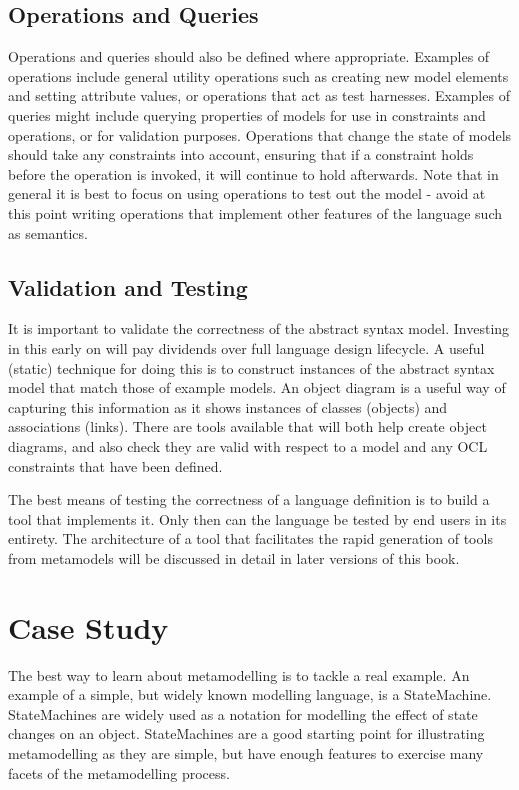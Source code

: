 \subsection{Operations and Queries}

Operations and queries should also be defined where appropriate.
Examples of operations include general utility operations such as
creating new model elements and setting attribute values, or
operations that act as test harnesses. Examples of queries might
include querying properties of models for use in constraints and
operations, or for validation purposes. Operations that change the
state of models should take any constraints into account, ensuring
that if a constraint holds before the operation is invoked, it
will continue to hold afterwards. Note that in general it is best
to focus on using operations to test out the model - avoid at this
point writing operations that implement other features of the
language such as semantics.

\subsection{Validation and Testing}

It is important to validate the correctness of the abstract syntax
model. Investing in this early on will pay dividends over full
language design lifecycle. A useful (static) technique for doing
this is to construct instances of the abstract syntax model that
match those of example models. An object diagram is a useful way
of capturing this information as it shows instances of classes
(objects) and associations (links). There are tools available that
will both help create object diagrams, and also check they are
valid with respect to a model and any OCL constraints that have
been defined.

The best means of testing the correctness of a language definition
is to build a tool that implements it. Only then can the language
be tested by end users in its entirety. The architecture of a tool
that facilitates the rapid generation of tools from metamodels
will be discussed in detail in later versions of this book.

\section{Case Study}

The best way to learn about metamodelling is to tackle a real
example. An example of a simple, but widely known modelling
language, is a StateMachine. StateMachines are widely used as a
notation for modelling the effect of state changes on an object.
StateMachines are a good starting point for illustrating
metamodelling as they are simple, but have enough features to
exercise many facets of the metamodelling process.

